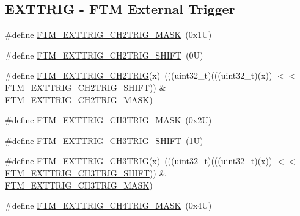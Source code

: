 \subsection*{E\+X\+T\+T\+R\+IG -\/ F\+TM External Trigger}
\begin{DoxyCompactItemize}
\item 
\#define \mbox{\hyperlink{group___f_t_m___register___masks_ga156b1af5902f975c8d6b667e77ce11da}{F\+T\+M\+\_\+\+E\+X\+T\+T\+R\+I\+G\+\_\+\+C\+H2\+T\+R\+I\+G\+\_\+\+M\+A\+SK}}~(0x1\+U)
\item 
\#define \mbox{\hyperlink{group___f_t_m___register___masks_ga6bd01126a4e39a0ccf9446da55a86c53}{F\+T\+M\+\_\+\+E\+X\+T\+T\+R\+I\+G\+\_\+\+C\+H2\+T\+R\+I\+G\+\_\+\+S\+H\+I\+FT}}~(0\+U)
\item 
\#define \mbox{\hyperlink{group___f_t_m___register___masks_ga179ecdb7546b430801a0c899cc275995}{F\+T\+M\+\_\+\+E\+X\+T\+T\+R\+I\+G\+\_\+\+C\+H2\+T\+R\+IG}}(x)~(((uint32\+\_\+t)(((uint32\+\_\+t)(x)) $<$$<$ \mbox{\hyperlink{group___f_t_m___register___masks_ga6bd01126a4e39a0ccf9446da55a86c53}{F\+T\+M\+\_\+\+E\+X\+T\+T\+R\+I\+G\+\_\+\+C\+H2\+T\+R\+I\+G\+\_\+\+S\+H\+I\+FT}})) \& \mbox{\hyperlink{group___f_t_m___register___masks_ga156b1af5902f975c8d6b667e77ce11da}{F\+T\+M\+\_\+\+E\+X\+T\+T\+R\+I\+G\+\_\+\+C\+H2\+T\+R\+I\+G\+\_\+\+M\+A\+SK}})
\item 
\#define \mbox{\hyperlink{group___f_t_m___register___masks_gaeec1aec17cdbd9a74b521b085dee6bf2}{F\+T\+M\+\_\+\+E\+X\+T\+T\+R\+I\+G\+\_\+\+C\+H3\+T\+R\+I\+G\+\_\+\+M\+A\+SK}}~(0x2\+U)
\item 
\#define \mbox{\hyperlink{group___f_t_m___register___masks_ga9e1c577c8cb405f8e8b518445ca1139a}{F\+T\+M\+\_\+\+E\+X\+T\+T\+R\+I\+G\+\_\+\+C\+H3\+T\+R\+I\+G\+\_\+\+S\+H\+I\+FT}}~(1\+U)
\item 
\#define \mbox{\hyperlink{group___f_t_m___register___masks_gac6e75bfc9a11c26ea99b819a3d83886c}{F\+T\+M\+\_\+\+E\+X\+T\+T\+R\+I\+G\+\_\+\+C\+H3\+T\+R\+IG}}(x)~(((uint32\+\_\+t)(((uint32\+\_\+t)(x)) $<$$<$ \mbox{\hyperlink{group___f_t_m___register___masks_ga9e1c577c8cb405f8e8b518445ca1139a}{F\+T\+M\+\_\+\+E\+X\+T\+T\+R\+I\+G\+\_\+\+C\+H3\+T\+R\+I\+G\+\_\+\+S\+H\+I\+FT}})) \& \mbox{\hyperlink{group___f_t_m___register___masks_gaeec1aec17cdbd9a74b521b085dee6bf2}{F\+T\+M\+\_\+\+E\+X\+T\+T\+R\+I\+G\+\_\+\+C\+H3\+T\+R\+I\+G\+\_\+\+M\+A\+SK}})
\item 
\#define \mbox{\hyperlink{group___f_t_m___register___masks_gaf8bedf8c8979cb1fa16cb9b35c7a4399}{F\+T\+M\+\_\+\+E\+X\+T\+T\+R\+I\+G\+\_\+\+C\+H4\+T\+R\+I\+G\+\_\+\+M\+A\+SK}}~(0x4\+U)

\end{DoxyCompactItemize}
